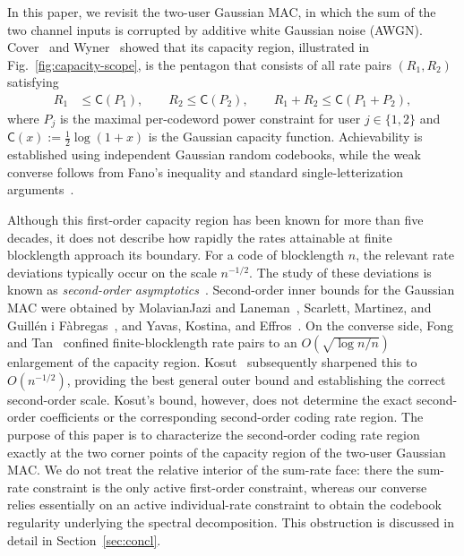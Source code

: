 \documentclass[11pt,onecolumn]{IEEEtran}
\newcommand{\rvC}{\mathsf{C}}
\begin{document}
In this paper, we revisit the two-user Gaussian MAC, in which the sum of the two channel inputs is corrupted by additive white Gaussian noise (AWGN). Cover~\cite{Cover1975SomeAdvances} and Wyner~\cite{wyner74} showed that its capacity region, illustrated in Fig.~\ref{fig:capacity-scope}, is the pentagon that consists of all rate pairs $(R_1,R_2)$ satisfying
\begin{align}
R_1&\le \rvC(P_1),\qquad
R_2\le \rvC(P_2),\qquad
R_1+R_2\le \rvC(P_1+P_2),
\label{eqn:cap_region_intro}
\end{align}
where $P_j$ is the maximal per-codeword power constraint for user $j \in \{1,2\}$ and $\rvC(x):=\frac12\log(1+x)$  is the Gaussian capacity function. Achievability is established using
independent Gaussian random codebooks, while the weak converse follows from
Fano's inequality and standard single-letterization arguments~\cite{elgamal}.

Although this first-order capacity region has been known for more than five decades, it does not describe how rapidly the rates attainable at finite blocklength approach its boundary. For a code of blocklength $n$, the relevant rate deviations typically occur on the scale $n^{-1/2}$. The study of these deviations is known as \emph{second-order asymptotics}~\cite{Tan14}. Second-order inner bounds for the Gaussian MAC were obtained by MolavianJazi and Laneman~\cite{MolavianJaziLaneman2015}, Scarlett, Martinez,
and Guill\'en i F\`abregas~\cite{ScarlettMartinezGuillen2015}, and Yavas, Kostina, and Effros~\cite{yavas21}. On the converse side, Fong and Tan~\cite{fongtan16} confined finite-blocklength rate pairs to an \(O(\sqrt{\log n/n})\) enlargement of the capacity region. Kosut~\cite{Kosut2022Wringing} subsequently sharpened this to \(O(n^{-1/2})\), providing the best general outer bound and establishing the correct second-order scale. Kosut's bound, however, does not determine the exact second-order coefficients or the corresponding second-order coding rate region. The purpose of this paper is to characterize the second-order coding rate
region exactly at the two corner points of the  capacity
region of the two-user Gaussian MAC. We do not treat the relative interior of the sum-rate face: there the
sum-rate constraint is the only active first-order constraint, whereas our
converse relies essentially on an active individual-rate constraint to obtain
the codebook regularity underlying the spectral decomposition. This obstruction
is discussed in detail in Section~\ref{sec:concl}.

\end{document}
